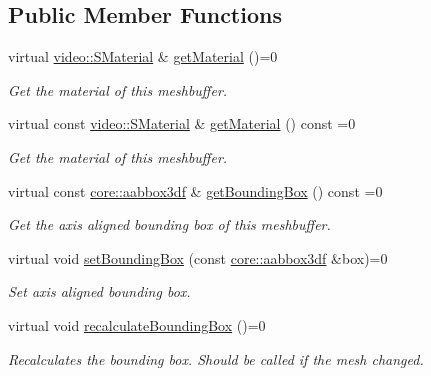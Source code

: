 \subsection*{Public Member Functions}
\begin{DoxyCompactItemize}
\item 
virtual \hyperlink{classirr_1_1video_1_1SMaterial}{video\+::\+S\+Material} \& \hyperlink{classirr_1_1scene_1_1IDynamicMeshBuffer_a6ed3a5ce948ebef063b7ea9e07974eb7}{get\+Material} ()=0
\begin{DoxyCompactList}\small\item\em Get the material of this meshbuffer. \end{DoxyCompactList}\item 
virtual const \hyperlink{classirr_1_1video_1_1SMaterial}{video\+::\+S\+Material} \& \hyperlink{classirr_1_1scene_1_1IDynamicMeshBuffer_a3be83e4819e9f79a3d9b264eb8bf4cfc}{get\+Material} () const =0
\begin{DoxyCompactList}\small\item\em Get the material of this meshbuffer. \end{DoxyCompactList}\item 
virtual const \hyperlink{namespaceirr_1_1core_a60f4b4c744aba55f10530d503c6ecb04}{core\+::aabbox3df} \& \hyperlink{classirr_1_1scene_1_1IDynamicMeshBuffer_a9053baee5a13c8b51e306d99e5ef7427}{get\+Bounding\+Box} () const =0
\begin{DoxyCompactList}\small\item\em Get the axis aligned bounding box of this meshbuffer. \end{DoxyCompactList}\item 
virtual void \hyperlink{classirr_1_1scene_1_1IDynamicMeshBuffer_adbe127e3774de6ae7ce96cb534a336e5}{set\+Bounding\+Box} (const \hyperlink{namespaceirr_1_1core_a60f4b4c744aba55f10530d503c6ecb04}{core\+::aabbox3df} \&box)=0
\begin{DoxyCompactList}\small\item\em Set axis aligned bounding box. \end{DoxyCompactList}\item 
\mbox{\label{classirr_1_1scene_1_1IDynamicMeshBuffer_a0b3351f29578e0340c2e2ce3d03c9e59}} 
virtual void \hyperlink{classirr_1_1scene_1_1IDynamicMeshBuffer_a0b3351f29578e0340c2e2ce3d03c9e59}{recalculate\+Bounding\+Box} ()=0
\begin{DoxyCompactList}\small\item\em Recalculates the bounding box. Should be called if the mesh changed. \end{DoxyCompactList}\item 

\end{DoxyCompactItemize}
